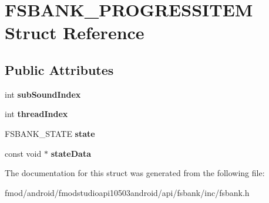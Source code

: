 \hypertarget{struct_f_s_b_a_n_k___p_r_o_g_r_e_s_s_i_t_e_m}{\section{F\+S\+B\+A\+N\+K\+\_\+\+P\+R\+O\+G\+R\+E\+S\+S\+I\+T\+E\+M Struct Reference}
\label{struct_f_s_b_a_n_k___p_r_o_g_r_e_s_s_i_t_e_m}
}
\subsection*{Public Attributes}
\begin{DoxyCompactItemize}
\item 
\hypertarget{struct_f_s_b_a_n_k___p_r_o_g_r_e_s_s_i_t_e_m_a1716d53660a6a0a1c2def733eb6b0600}{int {\bfseries sub\+Sound\+Index}}\label{struct_f_s_b_a_n_k___p_r_o_g_r_e_s_s_i_t_e_m_a1716d53660a6a0a1c2def733eb6b0600}

\item 
\hypertarget{struct_f_s_b_a_n_k___p_r_o_g_r_e_s_s_i_t_e_m_a86cefe3c51d1256cc9fdf8888ceeaf5b}{int {\bfseries thread\+Index}}\label{struct_f_s_b_a_n_k___p_r_o_g_r_e_s_s_i_t_e_m_a86cefe3c51d1256cc9fdf8888ceeaf5b}

\item 
\hypertarget{struct_f_s_b_a_n_k___p_r_o_g_r_e_s_s_i_t_e_m_ae1ae1f4e860c2045dbcce96f064df370}{F\+S\+B\+A\+N\+K\+\_\+\+S\+T\+A\+T\+E {\bfseries state}}\label{struct_f_s_b_a_n_k___p_r_o_g_r_e_s_s_i_t_e_m_ae1ae1f4e860c2045dbcce96f064df370}

\item 
\hypertarget{struct_f_s_b_a_n_k___p_r_o_g_r_e_s_s_i_t_e_m_a671883e64c4f51ad5baf654c81499999}{const void $\ast$ {\bfseries state\+Data}}\label{struct_f_s_b_a_n_k___p_r_o_g_r_e_s_s_i_t_e_m_a671883e64c4f51ad5baf654c81499999}

\end{DoxyCompactItemize}


The documentation for this struct was generated from the following file\+:\begin{DoxyCompactItemize}
\item 
fmod/android/fmodstudioapi10503android/api/fsbank/inc/fsbank.\+h\end{DoxyCompactItemize}
